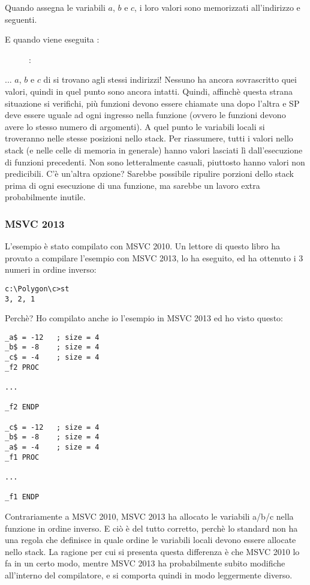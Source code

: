 Quando  assegna le variabili $a$, $b$ e $c$, i loro valori sono memorizzati all'indirizzo  e seguenti.

\clearpage
E quando viene eseguita :

\begin{figure}[H]
\centering
{}
\caption{\olly: }
\label{fig:stack_noise_olly2}
\end{figure}

... $a$, $b$ e $c$ di  si trovano agli stessi indirizzi!
Nessuno ha ancora sovrascritto quei valori, quindi in quel punto sono ancora intatti.
Quindi, affinchè questa strana situazione si verifichi, più funzioni devono essere chiamate una dopo l'altra e
\ac{SP} deve essere uguale ad ogni ingresso nella funzione (ovvero le funzioni devono avere lo stesso numero di argomenti).
A quel punto le variabili locali si troveranno nelle stesse posizioni nello stack.
Per riassumere, tutti i valori nello stack (e nelle celle di memoria in generale) hanno valori lasciati lì dall'esecuzione di funzioni precedenti.
Non sono letteralmente casuali, piuttosto hanno valori non predicibili.
C'è un'altra opzione?
Sarebbe possibile ripulire porzioni dello stack prima di ogni esecuzione di una funzione, ma sarebbe un lavoro extra probabilmente inutile.

\subsubsection{MSVC 2013}

L'esempio è stato compilato con MSVC 2010.
Un lettore di questo libro ha provato a compilare l'esempio con MSVC 2013, lo ha eseguito, ed ha ottenuto i 3 numeri in ordine inverso:%

\begin{lstlisting}
c:\Polygon\c>st
3, 2, 1
\end{lstlisting}

Perchè?
Ho compilato anche io l'esempio in MSVC 2013 ed ho visto questo:


\begin{lstlisting}[caption=MSVC 2013,style=customasmx86]
_a$ = -12	; size = 4
_b$ = -8	; size = 4
_c$ = -4	; size = 4
_f2	PROC

...

_f2	ENDP

_c$ = -12	; size = 4
_b$ = -8	; size = 4
_a$ = -4	; size = 4
_f1	PROC

...

_f1	ENDP
\end{lstlisting}

Contrariamente a MSVC 2010, MSVC 2013 ha allocato le variabili a/b/c nella funzione  in ordine inverso.%
E ciò è del tutto corretto, perchè lo standard \CCpp non ha una regola che definisce in quale ordine le variabili locali devono essere allocate nello stack.
La ragione per cui si presenta questa differenza è che MSVC 2010 lo fa in un certo modo, mentre MSVC 2013 ha probabilmente subito modifiche all'interno del compilatore, e si comporta quindi in modo leggermente diverso.
